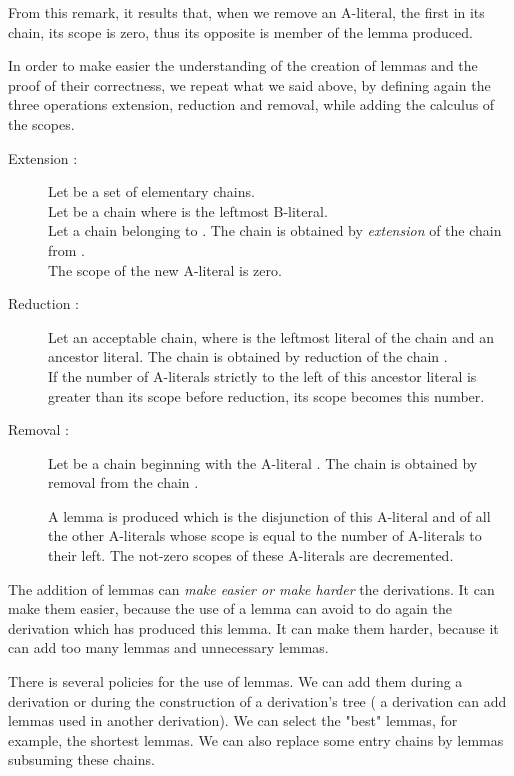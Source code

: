 \documentclass{article}
\begin{document}
From this remark, it results that, when we remove an A-literal, the first in its chain, its scope is zero, thus its opposite
is member of the lemma produced.

In order to make easier the understanding of the creation of lemmas and the proof of their correctness, we repeat what we said
above, by defining again the three operations extension, reduction and removal, while adding the calculus of the scopes. 


\begin{description}
\item [Extension :]
Let  be a set of elementary chains. \\
Let  be a chain   where  is the leftmost B-literal. \\
Let  a chain belonging to . The chain   
is obtained by \emph{extension} of the chain  from .\\
The scope of the new A-literal  is zero.

\item [Reduction :]
Let   an acceptable chain, where  is the leftmost literal of the chain and 
  an ancestor literal. The chain 
   is obtained by reduction of the chain .\\
If the number of A-literals strictly to the left of this ancestor literal is greater than its scope before reduction, its scope
becomes this number.

\item [Removal :] 
Let   be a chain beginning with the A-literal . The chain  is obtained by removal from the chain
 .

A lemma is produced which is the disjunction of this A-literal and of all the other A-literals 
whose scope is equal to the number
of A-literals to their left. The not-zero scopes of these A-literals are decremented.
\end{description}


The addition of lemmas can \emph{make easier or make harder} the derivations. It can make them easier, because the use of a lemma
can avoid to do again the derivation which has produced this lemma. 
It can make them harder, because it can add too many lemmas and unnecessary lemmas.

There is several policies for the use of lemmas. We can add them during a derivation or during the 
construction of a derivation's tree ( a derivation can add lemmas used in another derivation). 
We can select the "best" lemmas, for example, the shortest lemmas. We can also replace some entry chains by lemmas subsuming these
chains.
\end{document}
